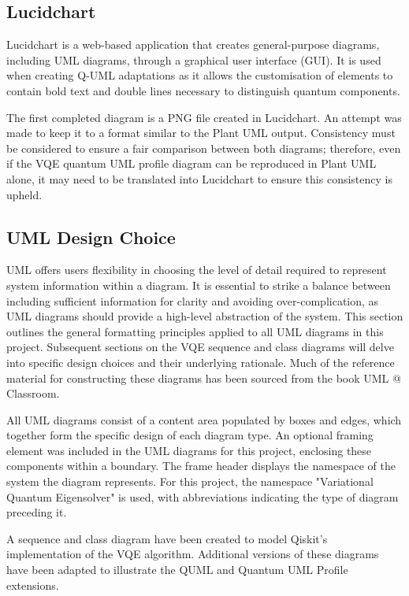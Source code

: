 \documentclass{article}
\begin{document}
{\subsection{Lucidchart}

Lucidchart is a web-based application that creates general-purpose diagrams, including UML diagrams, through a graphical user interface (GUI). It is used when creating Q-UML adaptations as it allows the customisation of elements to contain bold text and double lines necessary to distinguish quantum components. 

The first completed diagram is a PNG file created in Lucidchart. An attempt was made to keep it to a format similar to the Plant UML output. Consistency must be considered to ensure a fair comparison between both diagrams; therefore, even if the VQE quantum UML profile diagram can be reproduced in Plant UML alone, it may need to be translated into Lucidchart to ensure this consistency is upheld.

\subsection{UML Design Choice}

UML offers users flexibility in choosing the level of detail required to represent system information within a diagram. It is essential to strike a balance between including sufficient information for clarity and avoiding over-complication, as UML diagrams should provide a high-level abstraction of the system. This section outlines the general formatting principles applied to all UML diagrams in this project. Subsequent sections on the VQE sequence and class diagrams will delve into specific design choices and their underlying rationale. Much of the reference material for constructing these diagrams has been sourced from the book UML @ Classroom\cite{Seidl_Scholz_Huemer_Kappel_Duffy_2014}. 

All UML diagrams consist of a content area populated by boxes and edges, which together form the specific design of each diagram type. An optional framing element was included in the UML diagrams for this project, enclosing these components within a boundary. The frame header displays the namespace of the system the diagram represents\cite{UMLElementFrame}. For this project, the namespace "Variational Quantum Eigensolver" is used, with abbreviations indicating the type of diagram preceding it. 

A sequence and class diagram have been created to model Qiskit’s implementation of the VQE algorithm. Additional versions of these diagrams have been adapted to illustrate the QUML and Quantum UML Profile extensions.

}
\end{document}
